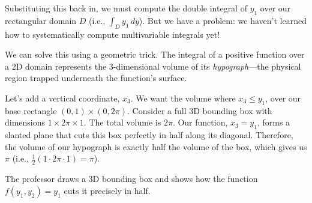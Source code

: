 \begin{spoken_clean}[00:22:55 - 00:26:33]
Substituting this back in, we must compute the double integral of $y_1$ over our rectangular domain $D$ (i.e., $\int_D y_1 \, dy$). But we have a problem: we haven't learned how to systematically compute multivariable integrals yet! 

We can solve this using a geometric trick. The integral of a positive function over a 2D domain represents the 3-dimensional volume of its \textit{hypograph}—the physical region trapped underneath the function's surface. 

Let's add a vertical coordinate, $x_3$. We want the volume where $x_3 \le y_1$, over our base rectangle $(0,1) \times (0, 2\pi)$. 
Consider a full 3D bounding box with dimensions $1 \times 2\pi \times 1$. The total volume is $2\pi$. Our function, $x_3 = y_1$, forms a slanted plane that cuts this box perfectly in half along its diagonal. Therefore, the volume of our hypograph is exactly half the volume of the box, which gives us $\pi$ (i.e., $\frac{1}{2} (1 \cdot 2\pi \cdot 1) = \pi$).
\end{spoken_clean}

\begin{nice-box}
The professor draws a 3D bounding box and shows how the function $f(y_1, y_2) = y_1$ cuts it precisely in half.
\end{nice-box}

